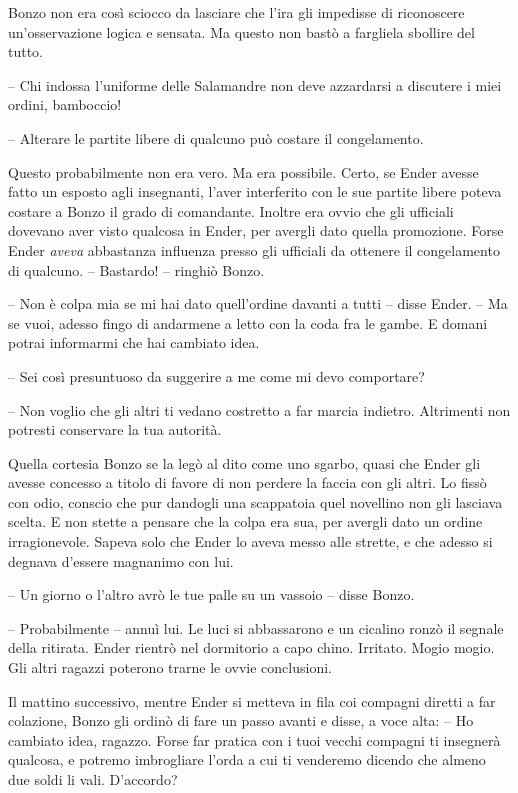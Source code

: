 {Bonzo non era così sciocco da lasciare che l'ira gli impedisse di
	riconoscere un'osservazione logica e sensata. Ma questo non bastò a
	fargliela sbollire del tutto.}

{-- Chi indossa l'uniforme delle Salamandre non deve azzardarsi a
	discutere i miei ordini, bamboccio!}

{-- Alterare le partite libere di qualcuno può costare il congelamento.}

{Questo probabilmente non era vero. Ma era possibile. Certo, se Ender
	avesse fatto un esposto agli insegnanti, l'aver interferito con le sue
	partite libere poteva costare a Bonzo il grado di comandante. Inoltre
	era ovvio che gli ufficiali dovevano aver visto qualcosa in Ender, per
	avergli dato quella promozione. Forse Ender \emph{aveva} abbastanza
	influenza presso gli ufficiali da ottenere il congelamento di qualcuno.
	-- Bastardo! -- ringhiò Bonzo.}

{-- Non è colpa mia se mi hai dato quell'ordine davanti a tutti -- disse
	Ender. -- Ma se vuoi, adesso fingo di andarmene a letto con la coda fra
	le gambe. E domani potrai informarmi che hai cambiato idea.}

{-- Sei così presuntuoso da suggerire a me come mi devo comportare?}

{-- Non voglio che gli altri ti vedano costretto a far marcia indietro.
	Altrimenti non potresti conservare la tua autorità.}

{Quella cortesia Bonzo se la legò al dito come uno sgarbo, quasi che
	Ender gli avesse concesso a titolo di favore di non perdere la faccia
	con gli altri. Lo fissò con odio, conscio che pur dandogli una
	scappatoia quel novellino non gli lasciava scelta. E non stette a
	pensare che la colpa era sua, per avergli dato un ordine irragionevole.
	Sapeva solo che Ender lo aveva messo alle strette, e che adesso si
	degnava d'essere magnanimo con lui.}

{-- Un giorno o l'altro avrò le tue palle su un vassoio -- disse Bonzo.}

{-- Probabilmente -- annuì lui. Le luci si abbassarono e un cicalino
	ronzò il segnale della ritirata. Ender rientrò nel dormitorio a capo
	chino. Irritato. Mogio mogio. Gli altri ragazzi poterono trarne le ovvie
	conclusioni.}

{Il mattino successivo, mentre Ender si metteva in fila coi compagni
	diretti a far colazione, Bonzo gli ordinò di fare un passo avanti e
	disse, a voce alta: -- Ho cambiato idea, ragazzo. Forse far pratica con
	i tuoi vecchi compagni ti insegnerà qualcosa, e potremo imbrogliare
	l'orda a cui ti venderemo dicendo che almeno due soldi li vali.
	D'accordo?}

